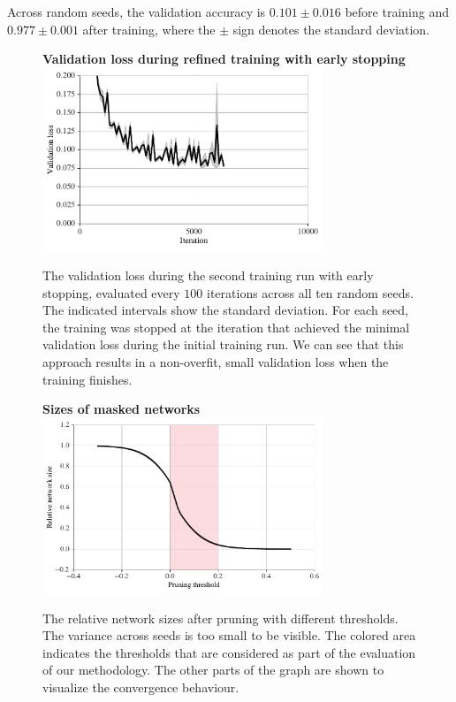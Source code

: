\documentclass[12pt,final,twoside]{article}
\theoremstyle{plain}
\theoremstyle{definition}
\theoremstyle{remark}
\theoremstyle{named}
\begin{document}
Across random seeds, the validation accuracy is $0.101 \pm 0.016$ before training and $0.977 \pm 0.001$ after training, where the $\pm$ sign denotes the standard deviation.

\newpage

\begin{figure}[H]
  \centering
  \textbf{Validation loss during refined training with early stopping}
  \includegraphics[width=0.75\textwidth]{plots/refined_trainings.pdf}
  \caption{The validation loss during the second training run with early stopping, evaluated every $100$ iterations across all ten random seeds. The indicated intervals show the standard deviation. For each seed, the training was stopped at the iteration that achieved the minimal validation loss during the initial training run. We can see that this approach results in a non-overfit, small validation loss when the training finishes.}
  \label{fig:refined-training}
\end{figure}

\begin{figure}[H]
  \centering
  \textbf{Sizes of masked networks}
  \includegraphics[width=0.75\textwidth]{plots/pruned_sizes.pdf}
  \caption{The relative network sizes after pruning with different thresholds. The variance across seeds is too small to be visible. The colored area indicates the thresholds that are considered as part of the evaluation of our methodology. The other parts of the graph are shown to visualize the convergence behaviour. }
  \label{fig:pruned-sizes}
\end{figure}
\end{document}

